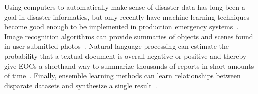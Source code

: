	Using computers to automatically make sense of disaster data has long
	been a goal in disaster informatics, but only recently have machine
	learning techniques become good enough to be implemented in production
	emergency systems~\cite{meierDigitalHumanitariansHow2015}. Image
	recognition algorithms can provide summaries of objects and scenes found
	in user submitted photos~\cite{nguyenRapidClassificationCrisisRelated,
	donahueDeCAFDeepConvolutional2013}. Natural language processing can
	estimate the probability that a textual document is overall negative or
	positive and thereby give EOCs a shorthand way to summarize thousands of
	reports in short amounts of
	time~\cite{nguyenRapidClassificationCrisisRelated,
	nagyCrowdSentimentDetection2012}. Finally, ensemble learning methods can
	learn relationships between disparate datasets and synthesize a single
	result~\cite{mouzannarDamageIdentificationSocial2018}.
